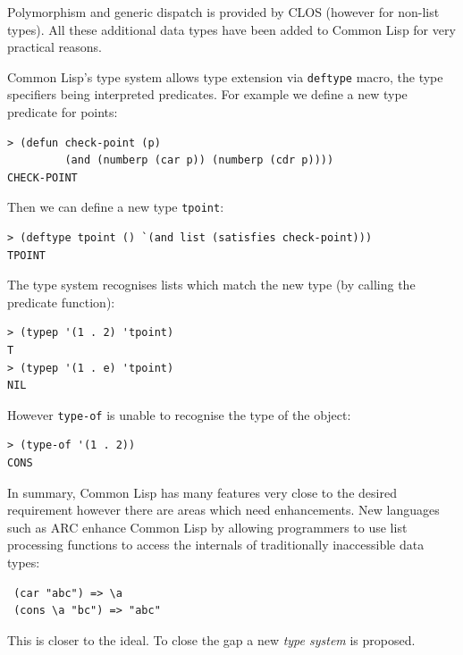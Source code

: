\documentclass[a4paper,12pt,dvips]{article}
\begin{document}
%
%
%
%
%
Polymorphism and generic dispatch is provided by CLOS (however for non-list types).
All these additional data types have been added to Common Lisp for very practical reasons.   

Common Lisp's type system allows type extension via \texttt{deftype} macro, the type specifiers being interpreted predicates. For example we define a new type predicate for points:
\begin{verbatim}
> (defun check-point (p) 
         (and (numberp (car p)) (numberp (cdr p))))
CHECK-POINT
\end{verbatim}
Then we can define a new type \texttt{tpoint}:
\begin{verbatim}
> (deftype tpoint () `(and list (satisfies check-point)))
TPOINT
\end{verbatim}
The type system recognises lists which match the new type (by calling the predicate function):
\begin{verbatim}> (typep '(1 . 2) 'tpoint)
T
> (typep '(1 . e) 'tpoint)
NIL
\end{verbatim}
However \texttt{type-of} is unable to recognise the type of the object:
\begin{verbatim}
> (type-of '(1 . 2))
CONS
\end{verbatim}
In summary, Common Lisp has many features very close to the desired requirement however there are areas which need enhancements. New languages such as ARC\cite{arc} enhance Common Lisp by allowing programmers to use list processing functions to access the internals of traditionally inaccessible data types: 
\begin{verbatim}
 (car "abc") => \a 
 (cons \a "bc") => "abc"
\end{verbatim}
This is closer to the ideal. To close the gap a new \emph{type system} is proposed.
\end{document}
